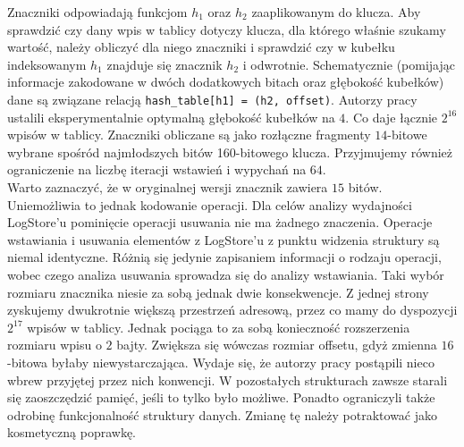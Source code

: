 \documentclass[declaration,shortabstract,masc]{iithesis}
\begin{document}
			\indent Znaczniki odpowiadają funkcjom $h_1$ oraz $h_2$ zaaplikowanym do klucza. Aby sprawdzić czy dany wpis w tablicy dotyczy klucza, dla którego właśnie szukamy wartość, należy obliczyć dla niego znaczniki i sprawdzić czy w kubełku indeksowanym $h_1$ znajduje się znacznik $h_2$ i odwrotnie. Schematycznie (pomijając informacje zakodowane w dwóch dodatkowych bitach oraz głębokość kubełków) dane są związane relacją \texttt{hash\_table[h1] = (h2, offset)}. Autorzy pracy \cite{SILT} ustalili eksperymentalnie optymalną głębokość kubełków na $4$. Co daje łącznie $2^{16}$ wpisów w tablicy. Znaczniki obliczane są jako rozłączne fragmenty $14$-bitowe wybrane spośród najmłodszych bitów 160-bitowego klucza. Przyjmujemy również ograniczenie na liczbę iteracji wstawień i wypychań na $64$.\\
			\indent Warto zaznaczyć, że w oryginalnej wersji znacznik zawiera $15$ bitów. Uniemożliwia to jednak kodowanie operacji. Dla celów analizy wydajności LogStore'u pominięcie operacji usuwania nie ma żadnego znaczenia. Operacje wstawiania i usuwania elementów z LogStore'u z punktu widzenia struktury są niemal identyczne. Różnią się jedynie zapisaniem informacji o rodzaju operacji, wobec czego analiza usuwania sprowadza się do analizy wstawiania. Taki wybór rozmiaru znacznika niesie za sobą jednak dwie konsekwencje. Z jednej strony zyskujemy dwukrotnie większą przestrzeń adresową, przez co mamy do dyspozycji $2^{17}$ wpisów w tablicy. Jednak pociąga to za sobą konieczność rozszerzenia rozmiaru wpisu o $2$ bajty. Zwiększa się wówczas rozmiar offsetu, gdyż zmienna $16$-bitowa byłaby niewystarczająca. Wydaje się, że autorzy pracy postąpili nieco wbrew przyjętej przez nich konwencji. W pozostałych strukturach zawsze starali się zaoszczędzić pamięć, jeśli to tylko było możliwe. Ponadto ograniczyli także odrobinę funkcjonalność struktury danych. Zmianę tę należy potraktować jako kosmetyczną poprawkę.\\
\end{document}
